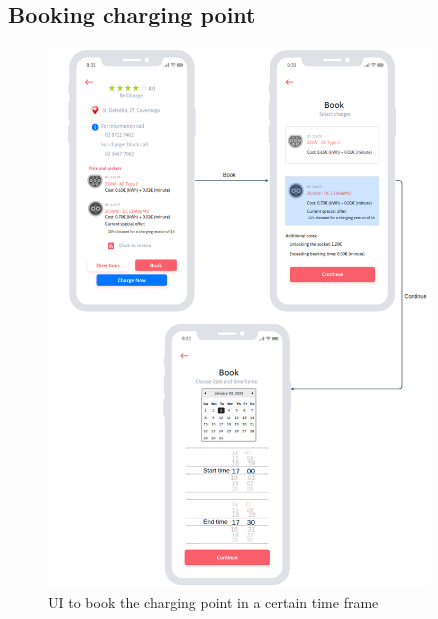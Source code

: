 \subsection{Booking charging point}
\begin{figure}[H]
    \centering
    \includegraphics[width=0.9\textwidth]{Images/cp3/bookingCP.png}
    \caption{UI to book the charging point in a certain time frame}
\end{figure}

